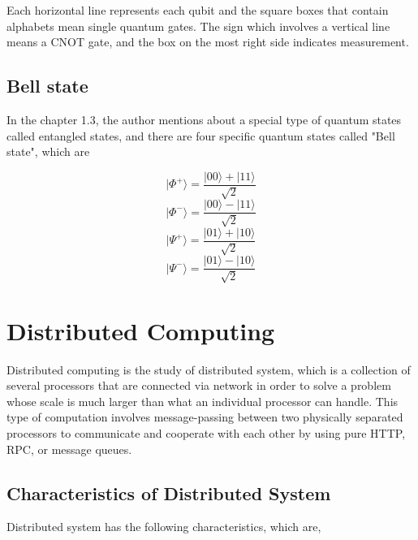 Each horizontal line represents each qubit and the square boxes that contain alphabets mean single quantum gates.  The sign which involves a vertical line means a CNOT gate, and the box on the most right side indicates measurement. 

\subsection{Bell state}

In the chapter 1.3, the author mentions about a special type of quantum states called entangled states, and there are four specific quantum states called "Bell state", which are

$$ |\Phi^+\rangle = \frac{|00\rangle + |11\rangle}{\sqrt{2}}$$
$$ |\Phi^-\rangle = \frac{|00\rangle - |11\rangle}{\sqrt{2}}$$
$$ |\Psi^+\rangle = \frac{|01\rangle + |10\rangle}{\sqrt{2}}$$
$$ |\Psi^-\rangle = \frac{|01\rangle - |10\rangle}{\sqrt{2}}$$

\newpage

\section{Distributed Computing}

 Distributed computing is the study of distributed system, which is a collection of several processors that are connected via network in order to solve a problem whose scale is much larger than what an individual processor can handle.  This type of computation involves message-passing between two physically separated processors to communicate and cooperate with each other by using pure HTTP, RPC, or message queues. \cite{distributedcomputingtext} 
 
 \subsection{Characteristics of Distributed System}
 \par Distributed system has the following characteristics, which are,
 
